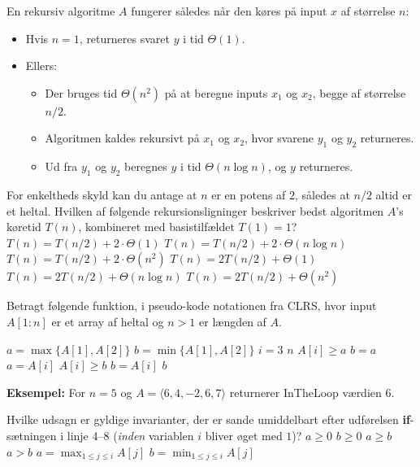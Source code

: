 En rekursiv algoritme $A$ fungerer således når den køres på input $x$ af størrelse $n$:
%
\begin{itemize}
  \item Hvis $n=1$, returneres svaret $y$ i tid $\Theta(1)$.
  \item Ellers:
  \begin{itemize}
  \item Der bruges tid $\Theta(n^2)$ på at beregne inputs $x_1$ og $x_2$, begge af størrelse $n/2$.
  \item Algoritmen kaldes rekursivt på $x_1$ og $x_2$, hvor svarene $y_1$ og $y_2$ returneres.
  \item Ud fra $y_1$ og $y_2$ beregnes $y$ i tid $\Theta(n \log n)$, og $y$ returneres.
\end{itemize}
\end{itemize}
%
For enkeltheds skyld kan du antage at $n$ er en potens af $2$, således at $n/2$ altid er et heltal.
Hvilken af følgende rekursionsligninger beskriver bedst algoritmen $A$'s køretid $T(n)$, kombineret med basistilfældet $T(1)=1$?
\etsvar
\mulighederstart
\svar $T(n) = T(n/2) + 2\cdot \Theta(1)$
\svar $T(n) = T(n/2) + 2\cdot \Theta(n \log n)$
\svar $T(n) = T(n/2) + 2\cdot \Theta(n^2)$
\svar $T(n) = 2 T(n/2) + \Theta(1)$
\svar $T(n) = 2 T(n/2) + \Theta(n \log n)$
\svar $T(n) = 2 T(n/2) + \Theta(n^2)$ \korrekt
\mulighederslut
{}



Betragt følgende funktion, i pseudo-kode notationen fra CLRS, hvor input $A[1:n]$ er et array af heltal og $n>1$ er længden af $A$.
\begin{codebox}
  \li $a = \max \{A[1], A[2]\}$
  \li $b = \min \{A[1], A[2]\}$
  \li \For $i = 3$ \To $n$
  \li \Do \If $A[i] \geq a$ \Do
  \li $b = a$
  \li $a = A[i]$
  \li \Else\If $A[i] \geq b$
  \li $b = A[i]$ \End\End
  \li \Return $b$
\end{codebox}

{\bf Eksempel:} For $n=5$ og $A = \langle 6, 4, -2, 6, 7\rangle$ returnerer {\sc InTheLoop} værdien $6$.
\medskip

\noindent
Hvilke udsagn er gyldige invarianter, der er sande umiddelbart efter udførelsen {\bf if}-sætningen i linje 4--8 (\emph{inden} variablen $i$ bliver øget med $1$)?
\fleresvar
\mulighederstart
\svar $a\geq 0$
\svar $b\geq 0$
\svar $a\geq b$ \korrekt
\svar $a > b$
\svar $a = \max_{1\leq j \leq i} A[j]$ \korrekt
\svar $b = \min_{1\leq j \leq i} A[j]$
\mulighederslut

